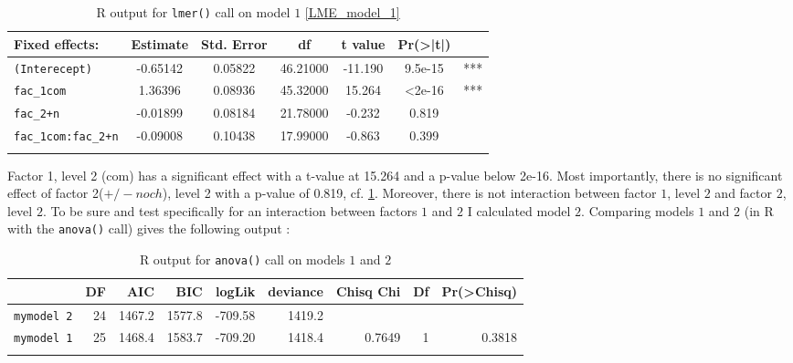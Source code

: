 \documentclass[output=paper,
modfonts
]{langscibook}
\begin{document}
\begin{table}
\begin{tabular}{lS[table-format=-1.5]S[table-format=1.5]S[table-format=2.5]S[table-format=-2.3]S[table-format=<1.1e3]l}
\lsptoprule
Fixed effects:    & {Estimate} & {Std. Error} & {df}        & {t value}   & {Pr(>|t|)}  & \\\midrule
\texttt{(Interecept)}        & -0.65142 & 0.05822 & 46.21000 & -11.190  & 9.5e-15   & {***}\\
\texttt{fac\_1com}           & 1.36396  & 0.08936 & 45.32000 & 15.264   & <2e-16   & {***}\\
\texttt{fac\_2+n}            & -0.01899 & 0.08184 & 21.78000 & -0.232   & 0.819     & \\
\texttt{fac\_1com:fac\_2+n}  & -0.09008 & 0.10438 & 17.99000 & -0.863   & 0.399     & \\\lspbottomrule
\end{tabular}
\caption{R output for \texttt{lmer()} call on model $1$ \ref{LME_model_1}}
\label{R_output_model_1}
\end{table}

\noindent Factor 1, level 2 (com) has a significant effect with a t-value at 15.264 and a p-value below 2e-16. Most importantly, there is no significant effect of factor 2($+/-noch$), level 2 with a p-value of 0.819, cf. \ref{R_output_model_1}. Moreover, there is not interaction between factor $1$, level $2$ and factor $2$, level $2$. To be sure and test specifically for an interaction between factors $1$ and $2$ I calculated model $2$. Comparing models $1$ and $2$ (in R with the \texttt{anova()} call) gives the following output \citep[cf.][]{winter2013}:

\begin{table}
\begin{tabular}{lrrrrrrrr}
\lsptoprule
                    & {DF} & {AIC}    & {BIC}    & {logLik}  & {deviance} & {Chisq Chi} & {Df} & {Pr(>Chisq)} \\\midrule
\texttt{mymodel 2}  & {24} & {1467.2} & {1577.8} & {-709.58} & {1419.2}   &               &        &                \\
\texttt{mymodel 1}  & {25} & {1468.4} & {1583.7} & {-709.20} & {1418.4}   & {0.7649}    & {1}  & {0.3818}     \\\lspbottomrule
\caption{R output for \texttt{anova()} call on models $1$ and $2$}
\label{R_output_anova_model_1_and_2}
\end{tabular}
\end{table}
\end{document}

